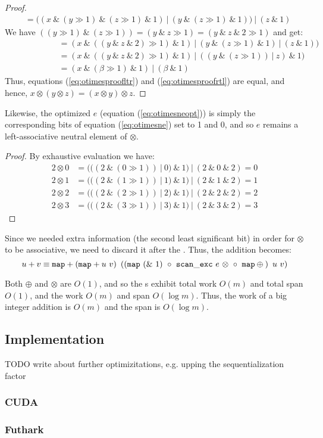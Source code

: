 \begin{proof}
\begin{align}
               &= ((x~\&~(y \gg 1)~\&~(z \gg 1)~\&~1)~|~(y~\&~(z \gg 1)~\&~1))~|~(z~\&~1)
\end{align}
We have $((y \gg 1)~\&~(z \gg 1)) = (y~\&~z \gg 1) = (y~\&~z~\&~2 \gg 1)$ and get:
\begin{align}
  &= (x~\&~((y~\&~z~\&~2) \gg 1)~\&~1)~|~(y~\&~(z \gg 1)~\&~1)~|~(z~\&~1))\\
  \phantom{((\alpha~\&~1)\&}&= (x~\&~((y~\&~z~\&~2) \gg 1)~\&~1)~|~((y~\&~(z \gg 1))~|~z)~\&~1)\\
  &= (x~\&~(\beta \gg 1)~\&~1)~|~(\beta~\&~1)
\end{align}
Thus, equations (\ref{eq:otimesproofltr}) and (\ref{eq:otimesproofrtl}) are equal, and hence, $x \otimes (y \otimes z) = (x \otimes y) \otimes z$.
\end{proof}




Likewise, the optimized $e$ (equation (\ref{eq:otimesneopt})) is simply the corresponding bits of equation (\ref{eq:otimesne}) set to 1 and 0, and so $e$ remains a left-associative neutral element of $\otimes$.

\begin{proof} By exhaustive evaluation we have:
\begin{align}
  \label{eq:otimesneproof}
  2 \otimes 0 &= (((2~\&~(0 \gg 1))~|~0)~\&~1)~|~(2~\&~0~\&~2) = 0 \\
  2 \otimes 1 &= (((2~\&~(1 \gg 1))~|~1)~\&~1)~|~(2~\&~1~\&~2) = 1 \\
  2 \otimes 2 &= (((2~\&~(2 \gg 1))~|~2)~\&~1)~|~(2~\&~2~\&~2) = 2 \\
  2 \otimes 3 &= (((2~\&~(3 \gg 1))~|~3)~\&~1)~|~(2~\&~3~\&~2) = 3
\end{align}
\end{proof}

Since we needed extra information (the second least significant bit) in order for $\otimes$ to be associative, we need to discard it after the . Thus, the addition becomes:
\begin{equation}
\label{eq:addgpu1}
u + v \equiv \mathtt{map} + \left( \mathtt{map} + u~v\right)~\left(\left(\mathtt{map}~(\&~1) ~\circ ~{\mathtt{scan\_exc}~e~\otimes}~ \circ ~ \mathtt{map} \oplus \phantom{}\right)~u~v\right)
\end{equation}

Both $\oplus$ and $\otimes$ are $O(1)$, and so the s exhibit total work $O(m)$ and total span $O(1)$, and the  work $O(m)$ and span $O(\log m)$. Thus, the work of a big integer addition is $O(m)$ and the span is $O(\log m)$.

\subsection{Implementation}

{\color{red} TODO write about further optimizitations, e.g. upping the sequentialization factor}

\subsubsection{CUDA}

\subsubsection{Futhark}

